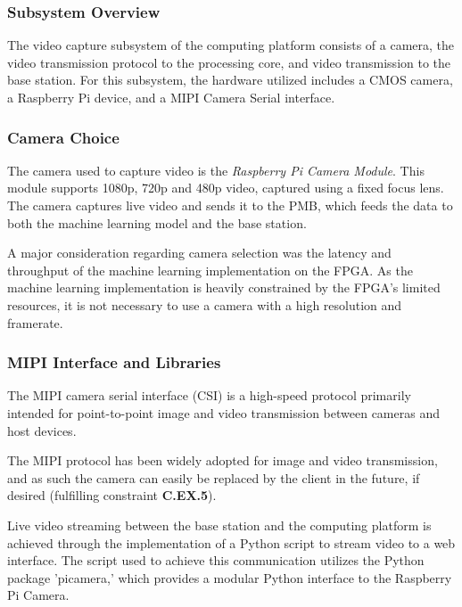 
\subsubsection{Subsystem Overview}
The video capture subsystem of the computing platform consists of a camera, the video transmission protocol to the processing core, and video transmission to the base station. For this subsystem, the hardware utilized includes a CMOS camera, a Raspberry Pi device, and a MIPI Camera Serial interface. 

\subsubsection{Camera Choice}
The camera used to capture video is the \textit{Raspberry Pi Camera Module}. This module supports 1080p, 720p and 480p video, captured using a fixed focus lens. The camera captures live video and sends it to the PMB, which feeds the data to both the machine learning model and the base station.

A major consideration regarding camera selection was the latency and throughput of the machine learning implementation on the FPGA. As the machine learning implementation is heavily constrained by the FPGA's limited resources, it is not necessary to use a camera with a high resolution and framerate.

\subsubsection{MIPI Interface and Libraries}
The MIPI camera serial interface (CSI) is a high-speed protocol primarily intended for point-to-point image and video transmission between cameras and host devices. 

The MIPI protocol has been widely adopted for image and video transmission, and as such the camera can easily be replaced by the client in the future, if desired (fulfilling constraint \textbf{C.EX.5}).

Live video streaming between the base station and the computing platform is achieved through the implementation of a Python script to stream video to a web interface. The script used to achieve this communication utilizes the Python package 'picamera,' which provides a modular Python interface to the Raspberry Pi Camera.

